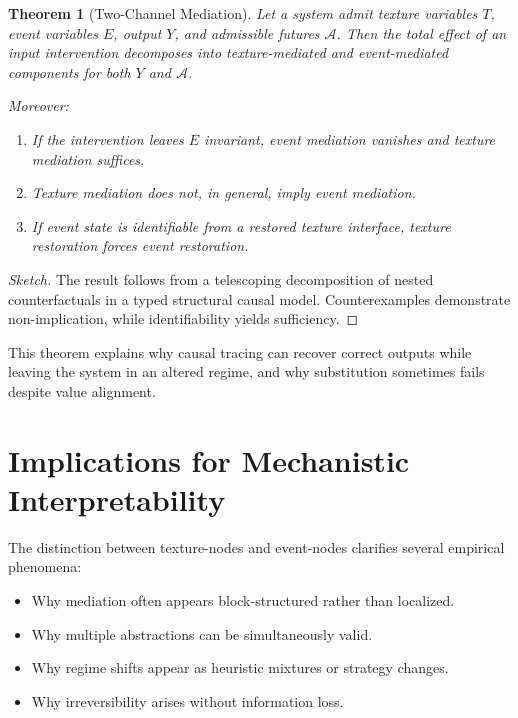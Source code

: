 \documentclass[11pt]{article}
\newtheorem{theorem}{Theorem}
\theoremstyle{remark}
\newcommand{\Adm}{\mathcal{A}}
\begin{document}
\begin{theorem}[Two-Channel Mediation]
Let a system admit texture variables $T$, event variables $E$, output $Y$, and admissible futures $\Adm$. Then the total effect of an input intervention decomposes into texture-mediated and event-mediated components for both $Y$ and $\Adm$.

Moreover:
\begin{enumerate}
\item If the intervention leaves $E$ invariant, event mediation vanishes and texture mediation suffices.
\item Texture mediation does not, in general, imply event mediation.
\item If event state is identifiable from a restored texture interface, texture restoration forces event restoration.
\end{enumerate}
\end{theorem}

\begin{proof}[Sketch]
The result follows from a telescoping decomposition of nested counterfactuals in a typed structural causal model. Counterexamples demonstrate non-implication, while identifiability yields sufficiency.
\end{proof}

This theorem explains why causal tracing can recover correct outputs while leaving the system in an altered regime, and why substitution sometimes fails despite value alignment.

\section{Implications for Mechanistic Interpretability}

The distinction between texture-nodes and event-nodes clarifies several empirical phenomena:

\begin{itemize}
\item Why mediation often appears block-structured rather than localized.
\item Why multiple abstractions can be simultaneously valid.
\item Why regime shifts appear as heuristic mixtures or strategy changes.
\item Why irreversibility arises without information loss.
\end{itemize}
\end{document}
